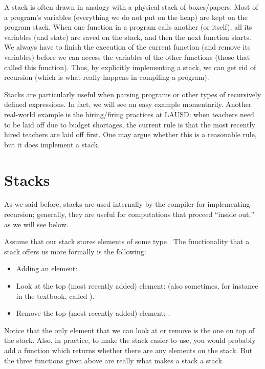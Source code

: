 A stack is often drawn in analogy with a physical stack of boxes/papers.
Most of a program's variables (everything we do not put on the heap) are
kept on the program stack.
When one function in a program calls another (or itself), all its
variables (and state) are saved on the stack, and then the next function starts.
We always have to finish the execution of the current function
(and remove its variables) before we can access the variables of the
other functions (those that called this function).
Thus, by explicitly implementing a stack, we can get rid of recursion
(which is what really happens in compiling a program).

Stacks are particularly useful when parsing programs or other types of
recursively defined expressions.
In fact, we will see an easy example momentarily.
Another real-world example is the hiring/firing practices at LAUSD:
when teachers need to be laid off due to budget shortages,
the current rule is that the most recently hired teachers are laid off
first.
One may argue whether this is a reasonable rule,
but it does implement a stack.

\section{Stacks}
As we said before, stacks are used internally by the compiler for
implementing recursion; generally, they are useful for computations
that proceed ``inside out,'' as we will see below.

Assume that our stack stores elements of some type .
The functionality that a stack offers us more formally is the following: 
\begin{itemize}
\item Adding an element: 
\item Look at the top (most recently added) element:
 (also sometimes, for instance in the textbook, called
).
\item Remove the top (most recently-added) element:
.
\end{itemize}
Notice that the only element that we can look at or remove is the one
on top of the stack.
Also, in practice, to make the stack easier to use,
you would probably add a function  which
returns whether there are any elements on the stack.
But the three functions given above are really what makes a stack a stack.

